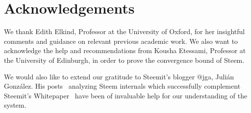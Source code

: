 \section{Acknowledgements}
  We thank Edith Elkind, Professor at the University of Oxford, for her insightful comments and guidance on relevant previous academic work.
  We also want to acknowledge the help and recommendations from Kousha Etessami, Professor at the University of Edinburgh, in order to prove the convergence bound of Steem.

  We would also like to extend our gratitude to Steemit's blogger @jga, Juli\'an Gonz\'alez. His posts~\cite{curationRewards,selfvoters} analyzing Steem internals which successfully complement Steemit's Whitepaper~\cite{steemit} have been of invaluable help for our understanding of the system.

